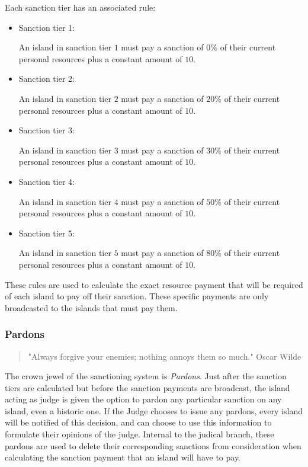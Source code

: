 Each sanction tier has an associated rule:
\begin{itemize}
    \item Sanction tier 1: \begin{rule_IIGO} 
        An island in sanction tier $1$ must pay a sanction of $0$\% of their current personal resources plus a constant amount of $10$.
    \end{rule_IIGO}
    \item Sanction tier 2: \begin{rule_IIGO} 
        An island in sanction tier $2$ must pay a sanction of $20$\% of their current personal resources plus a constant amount of $10$.
    \end{rule_IIGO}
    \item Sanction tier 3: \begin{rule_IIGO} 
        An island in sanction tier $3$ must pay a sanction of $30$\% of their current personal resources plus a constant amount of $10$.
    \end{rule_IIGO}
    \item Sanction tier 4: \begin{rule_IIGO} 
        An island in sanction tier $4$ must pay a sanction of $50$\% of their current personal resources plus a constant amount of $10$.
    \end{rule_IIGO}
    \item Sanction tier 5: \begin{rule_IIGO} 
        An island in sanction tier $5$ must pay a sanction of $80$\% of their current personal resources plus a constant amount of $10$.
    \end{rule_IIGO}
\end{itemize}

These rules are used to calculate the exact resource payment that will be required of each island to pay off their sanction. These specific payments are only broadcasted to the islands that must pay them.

\subsubsection{Pardons}
\begin{quote}
    "Always forgive your enemies; nothing annoys them so much."
    \noindent Oscar Wilde
\end{quote}
The crown jewel of the sanctioning system is \emph{Pardons}. Just after the sanction tiers are calculated but before the sanction payments are broadcast, the island acting as judge is given the option to pardon any particular sanction on any island, even a historic one. 
If the Judge chooses to issue any pardons, every island will be notified of this decision, and can choose to use this information to formulate their opinions of the judge. 
Internal to the judical branch, these pardons are used to delete their corresponding sanctions from consideration when calculating the sanction payment that an island will have to pay.
